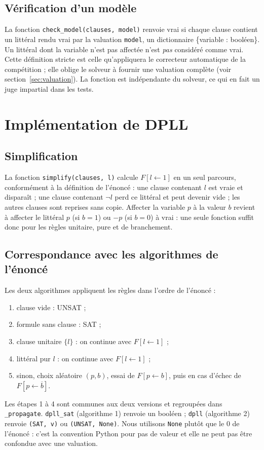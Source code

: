 \documentclass[11pt,a4paper]{article}
\begin{document}
\subsection{Vérification d'un modèle}

La fonction \texttt{check\_model(clauses, model)} renvoie vrai si chaque clause
contient un littéral rendu vrai par la valuation \texttt{model}, un
dictionnaire \{variable : booléen\}. Un littéral dont la variable n'est pas
affectée n'est \emph{pas} considéré comme vrai. Cette définition stricte est
celle qu'appliquera le correcteur automatique de la compétition ; elle oblige
le solveur à fournir une valuation complète (voir
section~\ref{sec:valuation}). La fonction est indépendante du solveur, ce qui
en fait un juge impartial dans les tests.

\section{Implémentation de DPLL}

\subsection{Simplification}

La fonction \texttt{simplify(clauses, l)} calcule $F[l\leftarrow 1]$ en un
seul parcours, conformément à la définition de l'énoncé : une clause contenant
$l$ est vraie et disparaît ; une clause contenant $\neg l$ perd ce littéral et
peut devenir vide ; les autres clauses sont reprises sans copie. Affecter la
variable $p$ à la valeur $b$ revient à affecter le littéral $p$ (si $b=1$) ou
$-p$ (si $b=0$) à vrai : une seule fonction suffit donc pour les règles
unitaire, pure et de branchement.

\subsection{Correspondance avec les algorithmes de l'énoncé}

Les deux algorithmes appliquent les règles dans l'ordre de l'énoncé :
\begin{enumerate}
  \item clause vide : UNSAT ;
  \item formule sans clause : SAT ;
  \item clause unitaire $\{l\}$ : on continue avec $F[l\leftarrow 1]$ ;
  \item littéral pur $l$ : on continue avec $F[l\leftarrow 1]$ ;
  \item sinon, choix aléatoire $(p,b)$, essai de $F[p\leftarrow b]$, puis
    en cas d'échec de $F[p\leftarrow\overline{b}]$.
\end{enumerate}
Les étapes 1 à 4 sont communes aux deux versions et regroupées dans
\texttt{\_propagate}. \texttt{dpll\_sat} (algorithme 1) renvoie un booléen ;
\texttt{dpll} (algorithme 2) renvoie \texttt{(SAT, v)} ou
\texttt{(UNSAT, None)}. Nous utilisons \texttt{None} plutôt que le $0$ de
l'énoncé : c'est la convention Python pour \og pas de valeur \fg{} et elle ne
peut pas être confondue avec une valuation.
\end{document}

